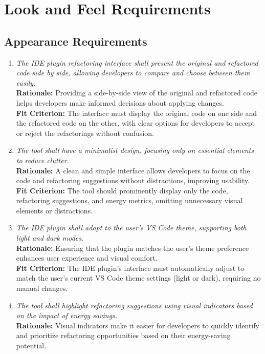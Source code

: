 \documentclass[12pt]{article}
\begin{document}
\section{Look and Feel Requirements}
\subsection{Appearance Requirements}
\begin{enumerate}[label=LFR-AP \arabic*., wide=0pt, leftmargin=*]
    \item \emph{The IDE plugin refactoring interface shall present the original and refactored code side by side, allowing developers to compare and choose between them easily.}\\[2mm]
    {\bf Rationale:} Providing a side-by-side view of the original and refactored code helps developers make informed decisions about applying changes.\\
    {\bf Fit Criterion:} The interface must display the original code on one side and the refactored code on the other, with clear options for developers to accept or reject the refactorings without confusion.
    \item \emph{The tool shall have a minimalist design, focusing only on essential elements to reduce clutter.}\\[2mm]
    {\bf Rationale:} A clean and simple interface allows developers to focus on the code and refactoring suggestions without distractions, improving usability.\\
    {\bf Fit Criterion:} The tool should prominently display only the code, refactoring suggestions, and energy metrics, omitting unnecessary visual elements or distractions.
    \item \emph{The IDE plugin shall adapt to the user’s VS Code theme, supporting both light and dark modes.}\\[2mm]
    {\bf Rationale:} Ensuring that the plugin matches the user's theme preference enhances user experience and visual comfort.\\
    {\bf Fit Criterion:} The IDE plugin’s interface must automatically adjust to match the user’s current VS Code theme settings (light or dark), requiring no manual changes.
    \item \emph{The tool shall highlight refactoring suggestions using visual indicators based on the impact of energy savings.}\\[2mm]
    {\bf Rationale:} Visual indicators make it easier for developers to quickly identify and prioritize refactoring opportunities based on their energy-saving potential.\\

\end{enumerate}
\end{document}
